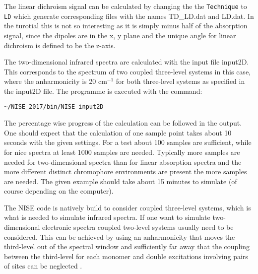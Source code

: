 The linear dichroism signal can be calculated by changing the the {\tt Technique} to {\tt LD} which generate corresponding files with the names TD\_LD.dat and LD.dat. In the turotial this is 
not so interesting as it is simply minus half of the absorption signal, since the dipoles are in the 
x, y plane and the unique angle for linear dichroism is defined to be the z-axis.

The two-dimensional infrared spectra are calculated with the input file input2D. This corresponds to the spectrum of two coupled three-level systems in this case, where the anharmonicity is 20 cm$^{-1}$ for both three-level systems as specified in the input2D file. The programme is executed with the command:
\begin{verbatim}
~/NISE_2017/bin/NISE input2D
\end{verbatim}
The percentage wise progress of the calculation can be followed in the output. One should expect that the calculation of one sample point takes about 10 seconds with the given settings. For a test about 100 samples are sufficient, while for nice spectra at least 1000 samples are needed. Typically more samples are needed for two-dimensional spectra than for linear absorption spectra and the more different distinct chromophore environments are present the more samples are needed. The given example should take about 15 minutes to simulate (of course depending on the computer).

The NISE code is natively build to consider coupled three-level systems, which is what is needed to simulate infrared spectra. If one want to simulate two-dimensional electronic spectra coupled two-level systems usually need to be considered. This can be achieved by using an anharmonicity that moves the third-level out of the spectral window and sufficiently far away that the coupling between the third-level for each monomer and double excitations involving pairs of sites can be neglected \cite{Olbrich.2011.JPCB.115.8609,Liang.2012.JCTC.8.1706}. 

